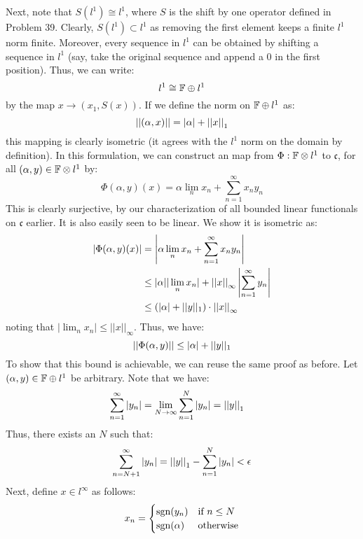 \documentclass[12pt]{article}
\begin{document}
\begin{solution}
\begin{enumerate}
        Next, note that $S(l^1) \cong l^1$, where $S$ is the shift by one operator defined in Problem 39. Clearly, $S(l^1) \subset l^1$ as removing the first element keeps a finite $l^1$ norm finite. Moreover, every sequence in $l^1$ can be obtained by shifting a sequence in $l^1$ (say, take the original sequence and append a $0$ in the first position). Thus, we can write: 
        \[ l^1 \cong \mathbb F \oplus l^1\]
        by the map $x \to (x_1, S(x))$. If we define the norm on $\mathbb F \oplus l^1$ as: 
        \[ ||(\alpha, x)|| = |\alpha| + \left\vert\left\vert x\right\vert\right\vert_1\]
        this mapping is clearly isometric (it agrees with the $l^1$ norm on the domain by definition). In this formulation, we can construct an map from $\Phi: \mathbb F \otimes l^1$ to $\mathfrak c$, for all $(\alpha, y) \in \mathbb F \otimes l^1$ by:
        \[ \Phi(\alpha, y)(x) = \alpha \lim_n x_n + \sum_{n=1}^\infty x_ny_n\]
        This is clearly surjective, by our characterization of all bounded linear functionals on $\mathfrak{c}$ earlier. It is also easily seen to be linear. We show it is isometric as:
        \begin{align*}
            |\Phi(\alpha, y)(x)| &= \left| \alpha \lim_n x_n + \sum_{n=1}^\infty x_ny_n\right| \\
            &\leq |\alpha| |\lim_n x_n| + \left\vert\left\vert x\right\vert\right\vert_\infty \left|\sum_{n=1}^\infty y_n\right| \\
            &\leq (|\alpha| + ||y||_1) \cdot \left\vert\left\vert x\right\vert\right\vert_\infty
        \end{align*}
        noting that $|\lim_n x_n| \leq ||x||_\infty$. Thus, we have: 
        \[ \left\vert\left\vert\Phi(\alpha, y)\right\vert\right\vert \leq |\alpha| + ||y||_1\]
        To show that this bound is achievable, we can reuse the same proof as before. \bbni 
        Let $(\alpha, y) \in \mathbb F \oplus l^1$ be arbitrary. Note that we have:
        \begin{align*}
            \sum_{n=1}^\infty |y_n| &= \lim_{N \to \infty} \sum_{n=1}^N |y_n| = \left\vert\left\vert y\right\vert\right\vert_1
        \end{align*} 
        Thus, there exists an $N$ such that: 
        \[\sum_{n=N+1}^\infty |y_n| = \left\vert\left\vert y\right\vert\right\vert_1 - \sum_{n=1}^N |y_n| < \epsilon\]
        Next, define $x \in l^\infty$ as follows: 
        \begin{align*}
            x_n = \begin{cases}
                \operatorname{sgn}(y_n) & \text{if } n \leq N \\
                \operatorname{sgn}(\alpha) & \text{otherwise} 
            \end{cases}
        \end{align*}

\end{enumerate}
\end{solution}
\end{document}
